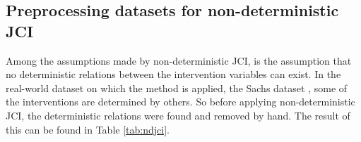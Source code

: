\documentclass[a4paper,pdf]{article}
\begin{document}
\subsection{Preprocessing datasets for non-deterministic JCI}
Among the assumptions made by non-deterministic JCI, is the assumption that no deterministic relations between the intervention variables can exist.
In the real-world dataset on which the method is applied, the Sachs dataset \cite{sachs2005causal}, some of the interventions are determined by others. So before applying non-deterministic JCI, the deterministic relations were found and removed by hand. The result of this can be found in Table \ref{tab:ndjci}.


\begin{table}[!ht]
    \centering
     \renewcommand{\arraystretch}{2}
    \setlength{\tabcolsep}{7pt}
    \caption{Table with several datasets used in the research and the respective values of the intervention variables. All of the deterministic relations caused by the intervention variables have been removed.\label{tab:ndjci}} %
\end{table}
\end{document}
